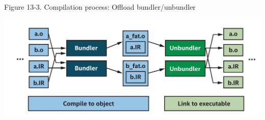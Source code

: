 \hspace*{\fill} \par %
Figure 13-3. Compilation process: Offload bundler/unbundler
\begin{center}
	\includegraphics[width=1.\textwidth]{content/chapter-13/images/4}
\end{center}




































